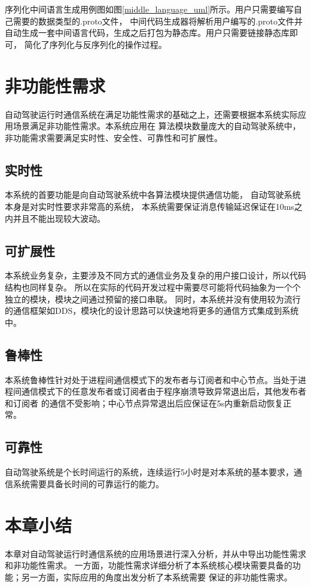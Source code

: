 序列化中间语言生成用例图如图\ref{middle_language_uml}所示。用户只需要编写自己需要的数据类型的.proto文件，
中间代码生成器将解析用户编写的.proto文件并自动生成一套中间语言代码，生成之后打包为静态库。用户只需要链接静态库即可，
简化了序列化与反序列化的操作过程。

\section{非功能性需求}
自动驾驶运行时通信系统在满足功能性需求的基础之上，还需要根据本系统实际应用场景满足非功能性需求。本系统应用在
算法模块数量庞大的自动驾驶系统中，非功能需求需要满足实时性、安全性、可靠性和可扩展性。

\subsection{实时性}
本系统的首要功能是向自动驾驶系统中各算法模块提供通信功能，
自动驾驶系统本身是对实时性要求非常高的系统，
本系统需要保证消息传输延迟保证在10ms之内并且不能出现较大波动。

\subsection{可扩展性}
本系统业务复杂，主要涉及不同方式的通信业务及复杂的用户接口设计，所以代码结构也同样复杂。
所以在实际的代码开发过程中需要尽可能将代码抽象为一个个独立的模块，模块之间通过预留的接口串联。
同时，本系统并没有使用较为流行的通信框架如DDS，模块化的设计思路可以快速地将更多的通信方式集成到系统中。

\subsection{鲁棒性}
本系统鲁棒性针对处于进程间通信模式下的发布者与订阅者和中心节点。当处于进程间通信模式下的任意发布者或订阅者由于程序崩溃导致异常退出后，其他发布者和订阅者
的通信不受影响；中心节点异常退出后应保证在5s内重新启动恢复正常。

\subsection{可靠性}
自动驾驶系统是个长时间运行的系统，连续运行5小时是对本系统的基本要求，通信系统需要具备长时间的可靠运行的能力。

\section{本章小结}
本章对自动驾驶运行时通信系统的应用场景进行深入分析，并从中导出功能性需求和非功能性需求。
一方面，功能性需求详细分析了本系统核心模块需要具备的功能；另一方面，实际应用的角度出发分析了本系统需要
保证的非功能性需求。








